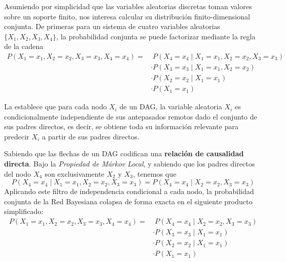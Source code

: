 \noindent
Asumiendo por simplicidad que las variables aleatorias discretas toman valores sobre un soporte finito, nos interesa calcular su distribución finito-dimensional conjunta. De primeras para un sistema de cuatro variables aleatorias $\{X_1, X_2, X_3, X_4\}$, la probabilidad conjunta se puede factorizar mediante la regla de la cadena
\begin{align*}
    P(X_1 = x_1, X_2 = x_2, X_3 = x_3, X_4 = x_4) = & \; P(X_4 = x_4 \mid X_1 = x_1, X_2 = x_2, X_3 = x_3) \\
    & \cdot P(X_3 = x_3 \mid X_1 = x_1, X_2 = x_2) \\
    & \cdot P(X_2 = x_2 \mid X_1 = x_1) \\
    & \cdot P(X_1 = x_1)
\end{align*}

\begin{definicion}
    La  establece que para cada nodo $X_i$ de un DAG, la variable aleatoria $X_i$ es condicionalmente independiente de sus antepasados remotos dado el conjunto de sus padres directos, es decir, se obtiene toda su información relevante para predecir $X_i$ a partir de sus padres directos.
\end{definicion}

\noindent
Sabiendo que las flechas de un DAG codifican una \textbf{relación de causalidad directa}. Bajo la \textit{Propiedad de Márkov Local}, y sabiendo que los padres directos del nodo $X_4$ son exclusivamente $X_2$ y $X_3$, tenemos que
\begin{equation*}
    P(X_4 = x_4 \mid X_1 = x_1, X_2 = x_2, X_3 = x_3) = P(X_4 = x_4 \mid X_2 = x_2, X_3 = x_3)
\end{equation*}
Aplicando este filtro de independencia condicional a cada nodo, la probabilidad conjunta de la Red Bayesiana colapsa de forma exacta en el siguiente producto simplificado:
\begin{align*}
    P(X_1 = x_1, X_2 = x_2, X_3 = x_3, X_4 = x_4) = & \; P(X_4 = x_4 \mid X_2 = x_2, X_3 = x_3) \\
    & \cdot P(X_3 = x_3 \mid X_1 = x_1) \\
    & \cdot P(X_2 = x_2 \mid X_1 = x_1) \\
    & \cdot P(X_1 = x_1)
\end{align*}

